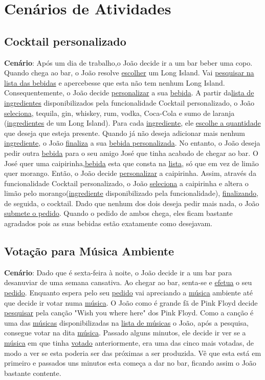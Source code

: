 \documentclass{article}
\begin{document}
\section*{Cenários de Atividades}

\subsection*{Cocktail personalizado}
\textbf{Cenário}: Após um dia de trabalho,o João decide ir a um bar beber uma copo. Quando chega ao bar, o João resolve  \underline{escolher} um Long Island. Vai \underline{pesquisar na lista das bebidas} e apercebesse que esta não tem nenhum Long Island. Consequentemente, o João decide \underline{personalizar} a sua \underline{bebida}. A partir da\underline{lista de ingredientes} disponibilizados pela funcionalidade Cocktail personalizado, o João \underline{seleciona}, tequila, gin, whiskey, rum, vodka, Coca-Cola e sumo de laranja (\underline{ingredientes} de um Long Island). Para cada \underline{ingrediente}, ele \underline{escolhe a quantidade} que deseja que esteja presente. Quando já não deseja adicionar mais nenhum \underline{ingrediente}, o João \underline{finaliza} a sua \underline{bebida personalizada}. No entanto, o João deseja pedir outra \underline{bebida} para o seu amigo José que tinha acabado de chegar ao bar. O José quer uma caipirinha,\underline{bebida} esta que consta na \underline{lista}, só que em vez de limão quer morango. Então, o João decide \underline{personalizar} a caipirinha. Assim, através da funcionalidade Cocktail personalizado, o João \underline{seleciona} a caipirinha e altera o limão pelo morango(\underline{ingrediente} disponibilizado pela funcionalidade), \underline{finalizando}, de seguida, o cocktail. Dado que nenhum dos dois deseja pedir mais nada, o João \underline{submete o pedido}. Quando o pedido de ambos chega, eles ficam bastante agradados pois as suas bebidas estão exatamente como desejavam.\\

\subsection*{Votação para Música Ambiente}
\textbf{Cenário}: Dado que é sexta-feira à noite, o João decide ir a um bar para desanuviar de uma semana cansativa. Ao chegar ao bar, senta-se e \underline{efetua} o seu \underline{pedido}. Enquanto espera pelo seu \underline{pedido} vai apreciando a  \underline{música} ambiente até que decide ir votar numa \underline{música}. O João como é grande fã de Pink Floyd decide \underline{pesquisar} pela canção "Wish you where here" dos Pink Floyd. Como a canção é uma das \underline{músicas} disponibilizadas na \underline{lista de músicas} o João, após a pesquisa, consegue votar na dita \underline{ música}. Passado alguns minutos, ele decide ir ver se a \underline{música} em que tinha \underline{votado} anteriormente, era uma das cinco mais votadas, de modo a ver se esta poderia ser das próximas a ser produzida. Vê que esta está em primeiro e passados uns minutos esta começa a dar no bar, ficando assim o João bastante contente.
\end{document}
